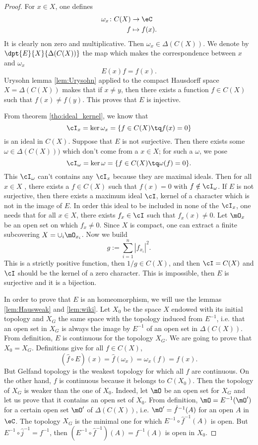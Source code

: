 \begin{proof}
For $x\in X$, one defines 
        \begin{equation}
        \begin{aligned}
            \omega_x \colon C(X) &\to \eC\\
            f&\mapsto f(x).
        \end{aligned}
    \end{equation}  
It is clearly non zero and multiplicative. Then $\omega_x\in\Delta(C(X))$. We denote by $ \dpt{E}{X}{\Delta(C(X))}$ the map which makes the correspondence between $x$ and $\omega_x$
\[ 
  E(x)f=f(x).
\]
Urysohn lemma \ref{lem:Urysohn} applied to the compact Hausdorff space $X=\Delta(C(X))$ makes that if $x\neq y$, then there exists a function $f\in C(X)$ such that $f(x)\neq f(y)$. This proves that $E$ is injective.

From theorem \ref{tho:ideal_kernel}, we know that 
\[ 
\cI_x=\ker\omega_x=\{f\in C(X)\tq f(x)=0\}
\]
is an ideal in $C(X)$. Suppose that $E$ is not surjective. Then there exists some $\omega\in\Delta(C(X)))$ which don't come from a $x\in X$; for such a $\omega$, we pose 
\[ 
\cI_{\omega}=\ker\omega=\{f\in C(X)\tq \omega(f)=0\}.
\]
 This $\cI_{\omega}$ can't contains any $\cI_x$ because they are maximal ideals. Then for all $x\in X$ , there exists a $f\in C(X)$ such that $f(x)=0$ with $f\notin\cI_{\omega}$. If $E$ is not surjective, then there exists a maximum ideal $\cI$, kernel of a character which is not in the image of $E$. In order this ideal to be included in none of the $\cI_x$, one needs that for all $x\in X$, there exists $f_x\in\cI$ such that $f_x(x)\neq 0$. Let $\mO_x$ be an open set on which $f_x\neq 0$. Since $X$ is compact, one can extract a finite subcovering $X=\cup_i\mO_{x_i}$. Now we build
\[ 
 g:=\sum_{i=1}^n|f_{x_i}|^2.
\]
This is a strictly positive function, then $1/g\in C(X)$, and then $\cI=C(X)$ and $\cI$ should be the kernel of a zero character. This is impossible, then $E$ is surjective and it is a bijection.

In order to prove that $E$ is an homeomorphism, we will use the lemmas \ref{lem:Hausweak} and \ref{lem:wiki}. Let $X_0$ be the space $X$ endowed with its initial topology and $X_G$ the same space with the topology induced from $E^{-1}$, i.e. that an open set in $X_G$ is always the image by $E^{-1}$ of an open set in $\Delta(C(X))$. From definition, $E$ is continuous for the topology $X_G$. We are going to prove that $X_0=X_G$. Definitions give for all $f\in C(X)$,
\[ 
 (\hat f\circ E)(x)=\hat f(\omega_x)=\omega_x(f)=f(x).
\]
But Gelfand topology is the weakest topology for which all $f$ are continuous. On the other hand, $f$ is continuous because it belongs to $C(X_0)$. Then the topology of $X_G$ is weaker than the one of $X_0$. Indeed, let $\mO$ be an open set for $X_G$ and let us prove that it contains an open set of $X_0$. From definition, $\mO=E^{-1}(\mO')$ for a certain open set $\mO'$ of $\Delta(C(X))$, i.e. $\mO'=\hat f^{-1}(A)$ for an open $A$ in $\eC$. The topology $X_G$ is the minimal one for which $E^{-1}\circ\hat f^{-1}(A)$ is open. But $E^{-1}\circ\hat j^{-1}=f^{-1}$, then $(E^{-1}\circ\hat f^{-1})(A)=f^{-1}(A)$ is open in $X_0$. 
\end{proof}


